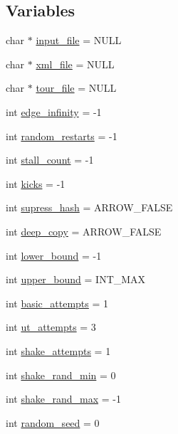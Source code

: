 \subsection*{Variables}
\begin{CompactItemize}
\item 
char $\ast$ \hyperlink{bin_2baltsp-dt_8c_a4f3a15de34c409bdec6ceacf93078ed}{input\_\-file} = NULL
\item 
char $\ast$ \hyperlink{bin_2baltsp-dt_8c_bf4e392494984c6ef8259268eb1fe421}{xml\_\-file} = NULL
\item 
char $\ast$ \hyperlink{bin_2baltsp-dt_8c_b818a82f867be75d7c4d92d792b0943e}{tour\_\-file} = NULL
\item 
int \hyperlink{bin_2baltsp-dt_8c_61a12d5995172f376610cce2f19e5855}{edge\_\-infinity} = -1
\item 
int \hyperlink{bin_2baltsp-dt_8c_e6a9db0fe5c8a0407d62dec2f7a14959}{random\_\-restarts} = -1
\item 
int \hyperlink{bin_2baltsp-dt_8c_a1641a28cf3ea572a56763e84518c17b}{stall\_\-count} = -1
\item 
int \hyperlink{bin_2baltsp-dt_8c_b8f057ba1ad6b7f0c46f8140b25b3467}{kicks} = -1
\item 
int \hyperlink{bin_2baltsp-dt_8c_c022145e682345ed4064bad274e5a4f1}{supress\_\-hash} = ARROW\_\-FALSE
\item 
int \hyperlink{bin_2baltsp-dt_8c_7298da576a5b127d04b4c46b3bc78821}{deep\_\-copy} = ARROW\_\-FALSE
\item 
int \hyperlink{bin_2baltsp-dt_8c_ed7394fd8e0c2796b26b9654fd10fd9d}{lower\_\-bound} = -1
\item 
int \hyperlink{bin_2baltsp-dt_8c_f5a34eb1d01ffd792adcadc9627ffcb8}{upper\_\-bound} = INT\_\-MAX
\item 
int \hyperlink{bin_2baltsp-dt_8c_227b7ec968925f365b96a92ace419c56}{basic\_\-attempts} = 1
\item 
int \hyperlink{bin_2baltsp-dt_8c_cbfe40b0a0830962ca1c4cfc2ad1aa97}{ut\_\-attempts} = 3
\item 
int \hyperlink{bin_2baltsp-dt_8c_a4451667ac0b07bcf8396ecdb8c90f6e}{shake\_\-attempts} = 1
\item 
int \hyperlink{bin_2baltsp-dt_8c_b7fc57ece1162e77f74b4803961b72cb}{shake\_\-rand\_\-min} = 0
\item 
int \hyperlink{bin_2baltsp-dt_8c_bcacd5fab89a9f3eaab5401c5001b4c5}{shake\_\-rand\_\-max} = -1
\item 
int \hyperlink{bin_2baltsp-dt_8c_d9059bc845096b2f05414a66c836b4ee}{random\_\-seed} = 0

\end{CompactItemize}
